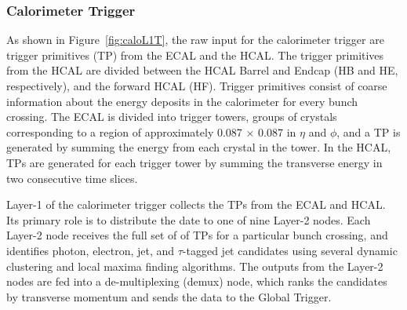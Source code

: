 
\subsubsection{Calorimeter Trigger}
As shown in Figure~\ref{fig:caloL1T}, the raw input for the calorimeter trigger are trigger primitives (TP) from the ECAL and the HCAL. The trigger primitives from the HCAL are divided between the HCAL Barrel and Endcap (HB and HE, respectively), and the forward HCAL (HF). Trigger primitives consist of coarse information about the energy deposits  in the calorimeter for every bunch crossing. The ECAL is divided into trigger towers, groups of crystals corresponding to a region of approximately 0.087 $\times$ 0.087 in $\eta$ and $\phi$, and a TP is generated by summing the energy from each crystal in the tower. In the HCAL, TPs are generated for each trigger tower by summing the transverse energy in two consecutive time slices. 

Layer-1 of the calorimeter trigger collects the TPs from the ECAL and HCAL. Its primary role is to distribute the date to one of nine Layer-2 nodes. Each Layer-2 node receives the full set of of TPs for a particular bunch crossing, and identifies photon, electron, jet, and $\tau$-tagged jet candidates using several dynamic clustering and local maxima finding algorithms. The outputs from the Layer-2 nodes are fed into a de-multiplexing (demux) node, which ranks the candidates by transverse momentum and sends the data to the Global Trigger. 


